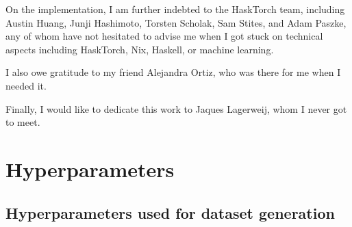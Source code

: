 \documentclass{article}
\begin{document}
On the implementation, I am further indebted to the HaskTorch team,
including Austin Huang, Junji Hashimoto, Torsten Scholak, Sam Stites, and Adam Paszke,
any of whom have not hesitated to advise me when I got stuck
on technical aspects including HaskTorch, Nix, Haskell, or machine learning.

I also owe gratitude to my friend Alejandra Ortiz, who was there for me when I needed it.

Finally, I would like to dedicate this work to Jaques Lagerweij,
whom I never got to meet.

\pagebreak

\nocite{*}
% 


\pagebreak

\appendix

\section{Hyperparameters} \label{sec:hpar}

\subsection{Hyperparameters used for dataset generation} \label{sec:gen-params}
\end{document}

